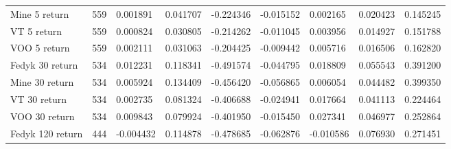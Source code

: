 \begin{appendices}
\begin{table}[ht]
\begin{adjustbox}{width=\textwidth}
\begin{tabular}{@{}l|llllllll@{}}
    Mine 5 return                 & 559                                & 0.001891                          & 0.041707                         & -0.224346                        & -0.015152                         & 0.002165                          & 0.020423                          & 0.145245                         \\
    VT 5 return               & 559                               & 0.000824                           & 0.030805                         & -0.214262                        & -0.011045                         & 0.003956                          & 0.014927                          & 0.151788                         \\
    VOO 5 return              & 559                               & 0.002111                           & 0.031063                         & -0.204425                        & -0.009442                         & 0.005716                          & 0.016506                          & 0.162820                         \\
    Fedyk 30 return               & 534                                & 0.012231                          & 0.118341                         & -0.491574                        & -0.044795                         & 0.018809                          & 0.055543                          & 0.391200                         \\
    Mine 30 return                & 534                                & 0.005924                          & 0.134409                         & -0.456420                        & -0.056865                         & 0.006054                          & 0.044482                          & 0.399350                         \\
    VT 30 return              & 534                               & 0.002735                           & 0.081324                         & -0.406688                        & -0.024941                         & 0.017664                          & 0.041113                          & 0.224464                         \\
    VOO 30 return             & 534                               & 0.009843                           & 0.079924                         & -0.401950                        & -0.015450                         & 0.027341                          & 0.046977                          & 0.252864                         \\
    Fedyk 120 return              & 444                                & -0.004432                         & 0.114878                         & -0.478685                        & -0.062876                         & -0.010586                         & 0.076930                          & 0.271451                         \\

\end{tabular}
\end{adjustbox}
\end{table}
\end{appendices}
